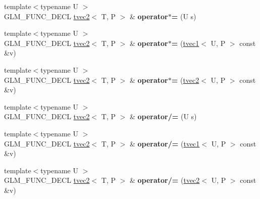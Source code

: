 \begin{DoxyCompactItemize}
\item 
\hypertarget{structglm_1_1tvec2_ae5b246dcaaf85450ff253579b4fc4a76}{{\footnotesize template$<$typename U $>$ }\\G\-L\-M\-\_\-\-F\-U\-N\-C\-\_\-\-D\-E\-C\-L \hyperlink{structglm_1_1tvec2}{tvec2}$<$ T, P $>$ \& {\bfseries operator$\ast$=} (U s)}\label{structglm_1_1tvec2_ae5b246dcaaf85450ff253579b4fc4a76}

\item 
\hypertarget{structglm_1_1tvec2_a750b6e459213cd75ca333054f188779f}{{\footnotesize template$<$typename U $>$ }\\G\-L\-M\-\_\-\-F\-U\-N\-C\-\_\-\-D\-E\-C\-L \hyperlink{structglm_1_1tvec2}{tvec2}$<$ T, P $>$ \& {\bfseries operator$\ast$=} (\hyperlink{structglm_1_1tvec1}{tvec1}$<$ U, P $>$ const \&v)}\label{structglm_1_1tvec2_a750b6e459213cd75ca333054f188779f}

\item 
\hypertarget{structglm_1_1tvec2_aa9e3fea6b7122af79c1fa65fc66c1170}{{\footnotesize template$<$typename U $>$ }\\G\-L\-M\-\_\-\-F\-U\-N\-C\-\_\-\-D\-E\-C\-L \hyperlink{structglm_1_1tvec2}{tvec2}$<$ T, P $>$ \& {\bfseries operator$\ast$=} (\hyperlink{structglm_1_1tvec2}{tvec2}$<$ U, P $>$ const \&v)}\label{structglm_1_1tvec2_aa9e3fea6b7122af79c1fa65fc66c1170}

\item 
\hypertarget{structglm_1_1tvec2_af02bb2db6f23af19ef3d6e0b33a05f3f}{{\footnotesize template$<$typename U $>$ }\\G\-L\-M\-\_\-\-F\-U\-N\-C\-\_\-\-D\-E\-C\-L \hyperlink{structglm_1_1tvec2}{tvec2}$<$ T, P $>$ \& {\bfseries operator/=} (U s)}\label{structglm_1_1tvec2_af02bb2db6f23af19ef3d6e0b33a05f3f}

\item 
\hypertarget{structglm_1_1tvec2_a4e8369479212934e679d59357f82db7b}{{\footnotesize template$<$typename U $>$ }\\G\-L\-M\-\_\-\-F\-U\-N\-C\-\_\-\-D\-E\-C\-L \hyperlink{structglm_1_1tvec2}{tvec2}$<$ T, P $>$ \& {\bfseries operator/=} (\hyperlink{structglm_1_1tvec1}{tvec1}$<$ U, P $>$ const \&v)}\label{structglm_1_1tvec2_a4e8369479212934e679d59357f82db7b}

\item 
\hypertarget{structglm_1_1tvec2_a42e14ad86fc32cc36ba3a512cd638585}{{\footnotesize template$<$typename U $>$ }\\G\-L\-M\-\_\-\-F\-U\-N\-C\-\_\-\-D\-E\-C\-L \hyperlink{structglm_1_1tvec2}{tvec2}$<$ T, P $>$ \& {\bfseries operator/=} (\hyperlink{structglm_1_1tvec2}{tvec2}$<$ U, P $>$ const \&v)}\label{structglm_1_1tvec2_a42e14ad86fc32cc36ba3a512cd638585}


\end{DoxyCompactItemize}

